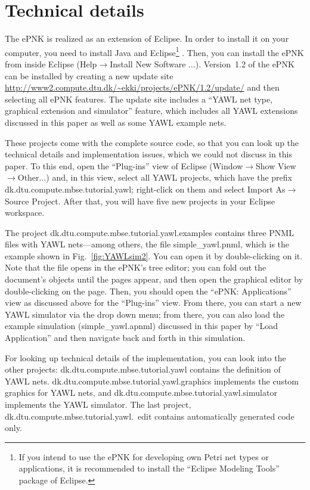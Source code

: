 \documentclass[a4paper]{llncs}
\begin{document}
\section{Technical details}
\label{sec:techdetails}

The ePNK is realized as an extension of Eclipse. In order to install it on your
computer, you need to install Java and Eclipse\footnote
{If you intend to use the ePNK for developing own Petri net types or
 applications, it is recommended to install the ``Eclipse Modeling Tools''
 package of Eclipse.}%
. Then, you can install the ePNK
from inside Eclipse (Help$\rightarrow$Install New Software $\ldots$). Version~1.2
of the ePNK can be installed by creating a new update site 
\url{http://www2.compute.dtu.dk/~ekki/projects/ePNK/1.2/update/} and then
selecting all ePNK features. The update site includes a ``YAWL net type,
graphical extension and simulator'' feature, which includes all YAWL extensions
discussed in this paper as well as some YAWL example nets.

These projects come with the complete source code, so that you can look up the
technical details and implementation issues, which we could not discuss in this
paper. To this end, open the ``Plug-ins'' view of Eclipse
(Window$\rightarrow$Show View$\rightarrow$Other$\ldots$)
and, in this view, select all YAWL projects, which
have the prefix {\sf dk.dtu.compute.mbse.tutorial.yawl}; right-click on them
and select Import As$\rightarrow$Source Project. After that, you will
have five new projects in your Eclipse workspace.

The project {\sf dk.dtu.compute.mbse.tutorial.yawl.examples} contains
three PNML files with YAWL nets---among others, the file {\sf simple\_yawl.pnml},
which is the example shown in Fig.~\ref{fig:YAWLsim2}. You can open it by double-clicking
on it. Note that the file opens in the ePNK's tree editor; you can fold out the
document's objects until the pages appear, and then open the graphical editor
by double-clicking on the page. Then, you should open the  ``ePNK: Applications''
view as discussed above for the ``Plug-ins'' view.  From there, you can start
a new YAWL simulator via the drop down menu; from there, you can also load the
example simulation ({\sf simple\_yawl.apnml}) discussed in this paper by
``Load Application'' and then navigate back and forth in this simulation.

For looking up technical details of the implementation, you can look into the
other projects: {\sf dk.dtu.compute.mbse.tutorial.yawl} contains the definition
of YAWL nets. {\sf dk.dtu.compute.mbse.tutorial.yawl.graphics} implements
the custom graphics for YAWL nets, and {\sf dk.dtu.compute.mbse.tutorial.yawl.simulator}
implements the YAWL simulator. The last project, {\sf dk.dtu.compute.mbse.tutorial.yawl.\ edit}
contains automatically generated code only.
\end{document}
